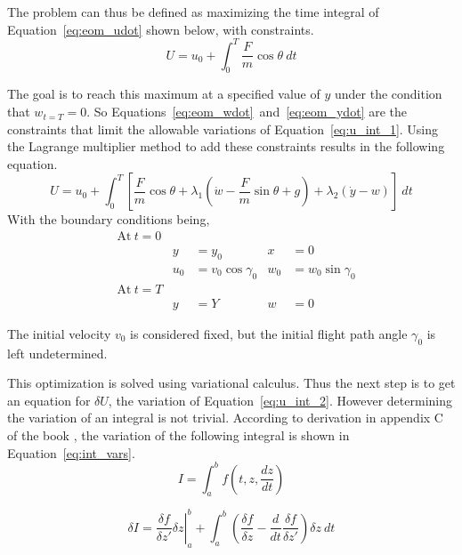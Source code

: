 The problem can thus be defined as maximizing the time integral of Equation~\eqref{eq:eom_udot} shown below, with constraints. 
\begin{equation}
    \label{eq:u_int_1}
    U= u_0+ \int_0^T{\frac{F}{m}\cos{\theta}}\ dt
\end{equation}

The goal is to reach this maximum at a specified value of $y$ under the condition that $w_{t=T}=0$. So Equations~\eqref{eq:eom_wdot}~and~\eqref{eq:eom_ydot} are the constraints that limit the allowable variations of Equation~\eqref{eq:u_int_1}. Using the Lagrange multiplier method to add these constraints results in the following equation.
\begin{equation}
    \label{eq:u_int_2}
    U = u_0 + \int_0^T{\left[\frac{F}{m}\cos{\theta}
                       + \lambda_1 \left(\dot{w}-\frac{F}{m}\sin{\theta} + g\right)
                       + \lambda_2 \left(\dot{y}-w\right)
    \right]}\ dt
\end{equation}
With the boundary conditions being,
\begin{equation*}
    \begin{aligned}
    &\text{At}\ t=0\\
      &&y &= y_0                &  x &= 0 \\ 
      &&u_0 &= v_0\cos{\gamma_0}  &  w_0 &= w_0\sin{\gamma_0} \\
    &\text{At}\ t=T \\
      &&y &= Y & w &= 0
    \end{aligned}
\end{equation*}

The initial velocity $v_0$ is considered fixed, but the initial flight path angle $\gamma_0$ is left undetermined.

This optimization is solved using variational calculus. Thus the next step is to get an equation for $\delta U$, the variation of Equation~\eqref{eq:u_int_2}. However determining the variation of an integral is not trivial. According to derivation in appendix C of the book \cite{thomson2012introduction}, the variation of the following integral is shown in Equation~\eqref{eq:int_vars}.
\begin{equation}
    I=\int_a^b{f\left( t, z, \frac{dz}{dt}\right)}
\end{equation}

\begin{equation}
    \label{eq:int_vars}
    \delta I = \left. \frac{\delta f}{\delta z'} \delta z \right |_a^b 
               + \int_a^b \left(\frac{\delta f}{\delta z} 
                                - \frac{d}{dt} \frac{\delta f}{\delta z'}\right)
               \delta z\ dt
\end{equation}

